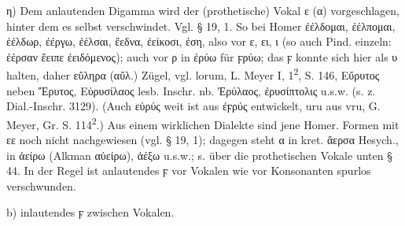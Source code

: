 η) Dem anlautenden Digamma wird der (prothetische) Vokal ε (α) vorgeschlagen, hinter dem es selbst verschwindet. Vgl. § 19, 1. So bei Homer ἐέλδομαι, ἐέλπομαι, ἐέλδωρ, ἐέργω, ἐέλσαι, ἔεδνα, ἐείκοσι, ἐση, also vor ε, ει, ι (so auch Pind. einzeln: ἐέρσαν ἔειπε ἐειδόμενος); auch vor ρ in ἐρύω für ϝρύω; das ϝ konnte sich hier als υ halten, daher εὔληρα (αὔλ.) Zügel, vgl.  lorum, L. Meyer I, 1\textsuperscript{2}, S. 146, Εὔρυτος neben Ἔρυτος, Εὐρυσίλαος lesb. Inschr. nb. Ἐρύλαος, ἐρυσίπτολις u.s.w. (s. z. Dial.-Inschr. 3129). (Auch εὐρύς weit ist aus ἐϝρύς entwickelt,  uru aus vru, G. Meyer, Gr. S. 114\textsuperscript{2}.) Aus einem wirklichen Dialekte sind jene Homer. Formen mit εε noch nicht nachgewiesen (vgl. § 19, 1); dagegen steht α in kret. ἄερσα Hesych., in ἀείρω (Alkman αὐείρω), ἀέξω u.s.w.; s. über die prothetischen Vokale unten § 44. In der Regel ist anlautendes ϝ vor Vokalen wie vor Konsonanten spurlos verschwunden. 

b) inlautendes ϝ zwischen Vokalen. 

